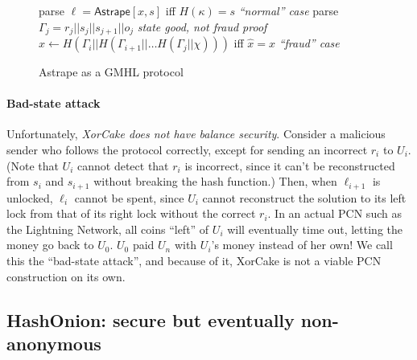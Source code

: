 \documentclass[USenglish,oneside,twocolumn]{article}
\begin{document}
\begin{figure}
\begin{framed}
\begin{minipage}{0.45\textwidth}
            \medskip
            \begin{algorithmic}
                \State parse $\ell = \mathsf{Astrape}[x,s]$
                \State {} iff $H(\kappa) = s$
                \Comment \emph{``normal'' case}
                \State {}
                \EndIf
                \State parse $\Gamma_j=r_j||s_j||s_{j+1}||o_j$
                \State {}
                \Comment \emph{state good, not fraud proof}
                \EndIf
                \State $\hat{x} \gets H(\Gamma_i || H(\Gamma_{i+1}||\dots H(\Gamma_j || \chi)))$
                \State {} iff $\hat{x} = x$
                \Comment \emph{``fraud'' case}
                \EndIf
                \EndFunction
            \end{algorithmic}
        \end{minipage}
    \end{framed}
    \caption{Astrape as a GMHL protocol}
    \label{fig:astrapegm}
\end{figure}

\paragraph*{Bad-state attack} Unfortunately, \emph{XorCake does not have balance security}. Consider a malicious sender who follows the protocol correctly, except for sending an incorrect $r_i$ to $U_i$. (Note that $U_i$ cannot detect that $r_i$ is incorrect, since it can't be reconstructed from $s_i$ and $s_{i+1}$ without breaking the hash function.) Then, when $\ell_{i+1}$ is unlocked, $\ell_{i}$ cannot be spent, since $U_i$ cannot reconstruct the solution to its left lock from that of its right lock without the correct $r_i$. In an actual PCN such as the Lightning Network, all coins ``left'' of $U_i$ will eventually time out, letting the money go back to $U_0$. $U_0$ paid $U_n$ with $U_i$'s money instead of her own! We call this the ``bad-state attack'', and because of it, XorCake is not a viable PCN construction on its own.

\subsection{HashOnion: secure but eventually non-anonymous}
\end{document}
